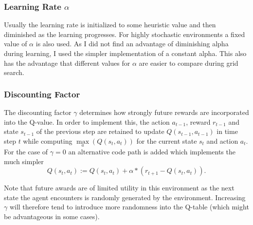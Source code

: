 \documentclass[11pt]{article}
\begin{document}
\subsubsection{Learning Rate $\alpha$}
Usually the learning rate is initialized to some heuristic value and then diminished as the learning progresses. For highly stochastic environments a fixed value of $\alpha$ is also used. As I did not find an advantage of diminishing alpha during learning, I used the simpler implementation of a constant alpha. This also has the advantage that different values for $\alpha$ are easier to compare during grid search.

\subsubsection{Discounting Factor}
The discounting factor $\gamma$ determines how strongly future rewards are incorporated into the Q-value. In order to implement this, the action $a_{t-1}$, reward $r_{t-1}$ and state $s_{t-1}$ of the previous step are retained to update $Q(s_{t-1},a_{t-1})$ in time step $t$ while computing $\max\limits_a(Q(s_{t},a_{t}))$ for the current state $s_t$ and action $a_t$. For the case of $\gamma = 0$ an alternative code path is added which implements the much simpler
\begin{equation}
    Q(s_t,a_t) :=  Q(s_t,a_t) + \alpha * (r_{t+1} - Q(s_t,a_t)).
\end{equation}

Note that future awards are of limited utility in this environment as the next state the agent encounters is randomly generated by the environment. Increasing $\gamma$ will therefore tend to introduce more randomness into the Q-table (which might be advantageous in some cases).
\end{document}
